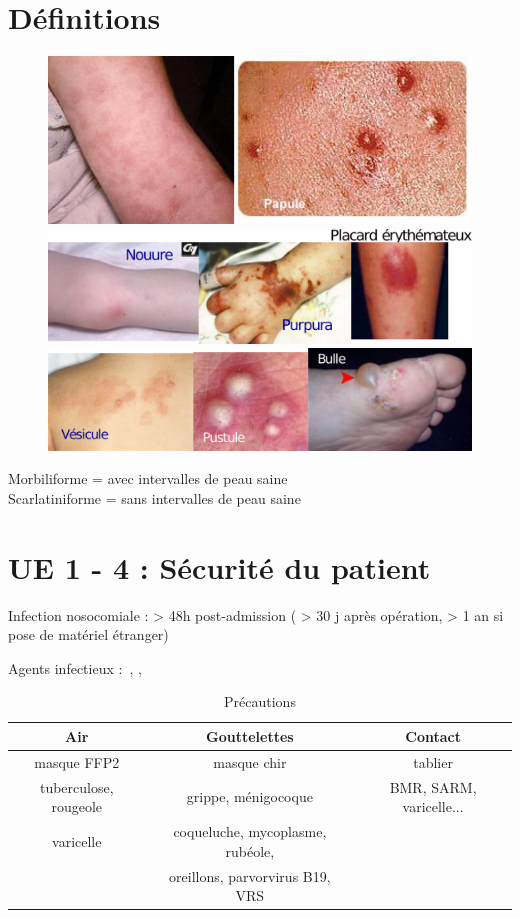 \graphicspath{{../../pictures/medecine/}}

\usetikzlibrary{quotes}

\section{Définitions}%
\label{sec:definitions}

\begin{figure}
  \centering
  \includegraphics[width=0.8\linewidth]{160_macule_papule}
  \includegraphics[width=0.8\linewidth]{160_purpura_placard}
  \includegraphics[width=0.8\linewidth]{160_vesicule}
\end{figure}

Morbiliforme = avec intervalles de peau saine\\
Scarlatiniforme = sans intervalles de peau saine


\section{UE 1 - 4 : Sécurité du patient}%
\label{sec:ue_1_item_4_securite_du_patient}

Infection nosocomiale : > 48h post-admission ( > 30 j après opération, > 1 an si
pose de matériel étranger)

Agents infectieux : , , 

\begin{table}[htpb]
  \centering
  \caption{Précautions}
  \begin{tabular}{ccc}
    \toprule
    Air & Gouttelettes & Contact  \\
    \midrule
    masque FFP2 & masque chir & tablier \\
    tuberculose, rougeole & grippe, ménigocoque & BMR, SARM, varicelle...\\
    varicelle & coqueluche, mycoplasme, rubéole, & \\
    & oreillons, parvorvirus B19, VRS & \\
    \bottomrule
  \end{tabular}
\end{table}

